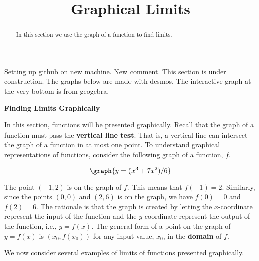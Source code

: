 \documentclass{ximera}
\title{Graphical Limits}
\begin{document}
\begin{abstract}
In this section we use the graph of a function to find limits.
\end{abstract}

\maketitle

Setting up github on new machine. New comment.
This section is under construction.
The graphs below are made with desmos.
The interactive graph at the very bottom is from geogebra.








\begin{center}
\bf{Finding Limits Graphically}
\end{center}

In this section, functions will be presented graphically. Recall that the graph of a 
function must pass the {\bf vertical line test}.  That is, a vertical line 
can intersect the graph of a function in at most one point.
To understand graphical representations of functions, consider the following graph of a function, $f$.

\[
\graph{y=(x^3 +7x^2)/6}
\]



The point $(-1,2)$ is on the graph of $f$.  This means that $f(-1) = 2$.  
Similarly, since the points $(0,0)$ and $(2,6)$ is on the graph, we have $f(0) = 0$ and $f(2) = 6$.  
The rationale is that the graph is created by letting the $x$-coordinate represent 
the input of the function and the $y$-coordinate represent the output of the 
function, i.e., $y = f(x)$.  The general form of a point on the graph of $y = f(x)$ is 
$(x_0, f(x_0))$ for any input value, $x_0$, in the {\bf domain} of $f$.


We now consider several examples of limits of functions presented graphically.
\end{document}
